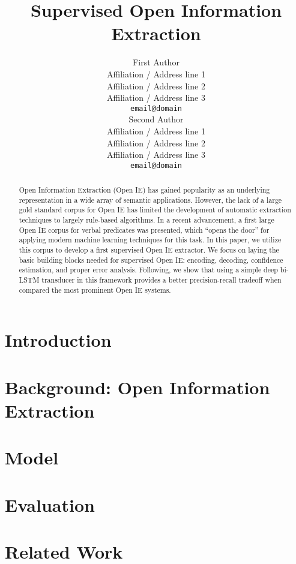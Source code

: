 \documentclass[11pt,a4paper]{article}
\title{Supervised Open Information Extraction}
\author{First Author \\
  Affiliation / Address line 1 \\
  Affiliation / Address line 2 \\
  Affiliation / Address line 3 \\
  {\tt email@domain} \\\And
  Second Author \\
  Affiliation / Address line 1 \\
  Affiliation / Address line 2 \\
  Affiliation / Address line 3 \\
  {\tt email@domain} \\}
\date{}
\begin{document}
\maketitle
\begin{abstract}
  Open Information Extraction (Open IE) has gained popularity as an underlying representation in a
  wide array of semantic applications.
  However, the lack of a large gold standard corpus for Open IE has
  limited the development of automatic extraction techniques to largely rule-based algorithms.
  In a recent advancement, a first large Open IE corpus for verbal predicates was presented, which ``opens the door'' for applying modern machine learning techniques for this task.
  In this paper, we utilize this corpus to develop a first supervised Open IE extractor.
  We focus on laying the basic building blocks needed for supervised Open IE: encoding, decoding, confidence estimation, and proper error analysis.
  Following, we show that using a simple deep bi-LSTM transducer in this framework
  provides a better precision-recall tradeoff when compared the most prominent Open IE systems.
\end{abstract}

\section{Introduction}
\label{sec:introduction}



\section{Background: Open Information Extraction}
\label{sec:background}




\section{Model}
\label{sec:model}


\section{Evaluation}
\label{sec:evaluation}


\section{Related Work}
\label{sec:related}

\end{document}
